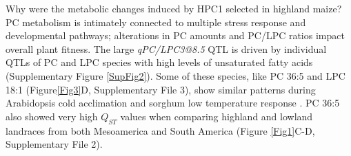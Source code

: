 \documentclass[9pt,twocolumn,twoside,lineno]{BioRxiv}
\begin{document}
Why were the metabolic changes induced by HPC1 selected in highland maize?
PC metabolism is intimately connected to multiple stress response and developmental pathways; alterations in PC amounts and PC/LPC ratios impact overall plant fitness.
The large \textit{qPC/LPC3@8.5} QTL is driven by individual QTLs of PC and LPC species with high levels of unsaturated fatty acids (Supplementary Figure \ref{SupFig2}).
Some of these species, like PC 36:5 and LPC 18:1  (Figure\ref{Fig3}D, Supplementary File 3), show similar patterns during Arabidopsis cold acclimation \cite{Welti2002-uk} and sorghum low temperature response \cite{Marla2017-ph}.
PC 36:5 also showed very high $Q_{ST}$ values when comparing highland and lowland landraces from both Mesoamerica and South America (Figure \ref{Fig1}C-D, Supplementary File 2).
\end{document}
